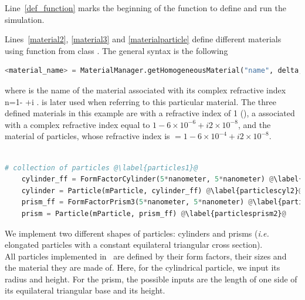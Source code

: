 \noindent Line~\ref{def_function} marks the beginning of the
function to define and run the simulation. 

\noindent Lines~\ref{material2}, \ref{material3} and \ref{materialparticle} define different
materials using function  from class
. The general syntax is the following 

\begin{lstlisting}[language=python, style=eclipse,numbers=none]
<material_name> = MaterialManager.getHomogeneousMaterial("name", delta, beta)
\end{lstlisting}

\noindent where  is the name of the
material associated with its complex refractive index
n=1- +i .  is later used when
referring to this particular material. The three defined materials in this example are  with a refractive
index of 1 (), a  associated with a complex refractive index
equal to $1-6\times 10^{-6} +i2\times 10^{-8} $, and the material of particles, whose refractive index is $=1-6\times 10^{-4}+i2\times 10^{-8}$.\\\\


\begin{lstlisting}[language=python,style=eclipseboxed,name=ex1,nolol]
    # collection of particles @\label{particles1}@
    cylinder_ff = FormFactorCylinder(5*nanometer, 5*nanometer) @\label{particlescyl1}@
    cylinder = Particle(mParticle, cylinder_ff) @\label{particlescyl2}@
    prism_ff = FormFactorPrism3(5*nanometer, 5*nanometer) @\label{particlesprism1}@
    prism = Particle(mParticle, prism_ff) @\label{particlesprism2}@
\end{lstlisting}

 \noindent We implement two different shapes of particles: cylinders and
 prisms (\textit{i.e.} elongated particles with a constant equilateral triangular cross section).\\ All particles implemented in \BornAgain\ are defined by their
 form factors, their sizes and the material
  they are made of. Here, for the
  cylindrical particle, we input its radius and height.  For the prism, 
  the possible inputs are the length of one side of its equilateral triangular
  base and its height.\\


